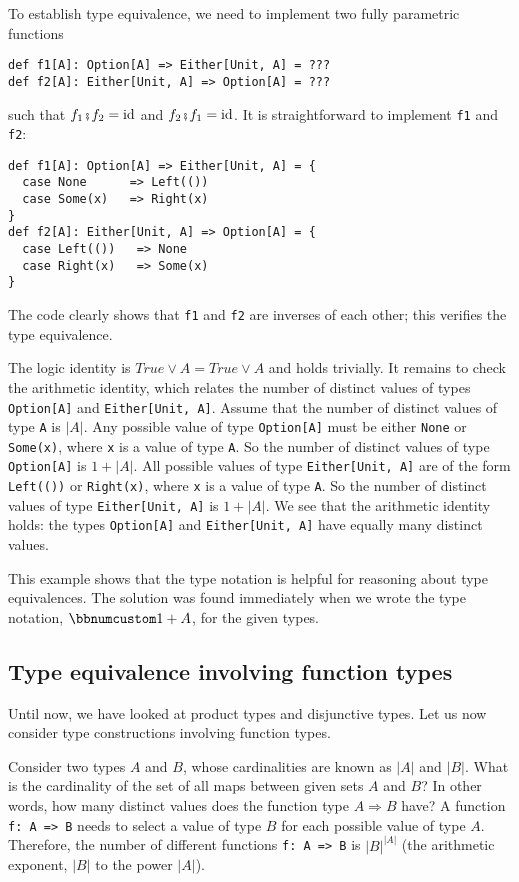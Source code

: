 To establish type equivalence, we need to implement two fully parametric
functions
\begin{lstlisting}
def f1[A]: Option[A] => Either[Unit, A] = ???
def f2[A]: Either[Unit, A] => Option[A] = ???
\end{lstlisting}
such that $f_{1}\bef f_{2}=\text{id}$ and $f_{2}\bef f_{1}=\text{id}$.
It is straightforward to implement \lstinline!f1! and \lstinline!f2!:
\begin{lstlisting}
def f1[A]: Option[A] => Either[Unit, A] = {
  case None      => Left(())
  case Some(x)   => Right(x)
}
def f2[A]: Either[Unit, A] => Option[A] = {
  case Left(())   => None
  case Right(x)   => Some(x)
}
\end{lstlisting}
The code clearly shows that \lstinline!f1! and \lstinline!f2! are
inverses of each other; this verifies the type equivalence.

The logic identity is $True\vee A=True\vee A$ and holds trivially.
It remains to check the arithmetic identity, which relates the number
of distinct values of types \lstinline!Option[A]! and \lstinline!Either[Unit, A]!.
Assume that the number of distinct values of type \lstinline!A! is
$\left|A\right|$. Any possible value of type \lstinline!Option[A]!
must be either \lstinline!None! or \lstinline!Some(x)!, where \lstinline!x!
is a value of type \lstinline!A!. So the number of distinct values
of type \lstinline!Option[A]! is $1+\left|A\right|$. All possible
values of type \lstinline!Either[Unit, A]! are of the form \lstinline!Left(())!
or \lstinline!Right(x)!, where \lstinline!x! is a value of type
\lstinline!A!. So the number of distinct values of type \lstinline!Either[Unit, A]!
is $1+\left|A\right|$. We see that the arithmetic identity holds:
the types \lstinline!Option[A]! and \lstinline!Either[Unit, A]!
have equally many distinct values.

This example shows that the type notation is helpful for reasoning
about type equivalences. The solution was found immediately when we
wrote the type notation, $\bbnum 1+A$, for the given types.

\subsection{Type equivalence involving function types}

Until now, we have looked at product types and disjunctive types.
Let us now consider type constructions involving function types.

Consider two types $A$ and $B$, whose cardinalities are known as
$\left|A\right|$ and $\left|B\right|$. What is the cardinality of
the set of all maps between given sets $A$ and $B$? In other words,
how many distinct values does the function type $A\Rightarrow B$
have? A function \lstinline!f: A => B! needs to select a value of
type $B$ for each possible value of type $A$. Therefore, the number
of different functions \lstinline!f: A => B! is $\left|B\right|^{\left|A\right|}$
(the arithmetic exponent, $\left|B\right|$ to the
power $\left|A\right|$).

